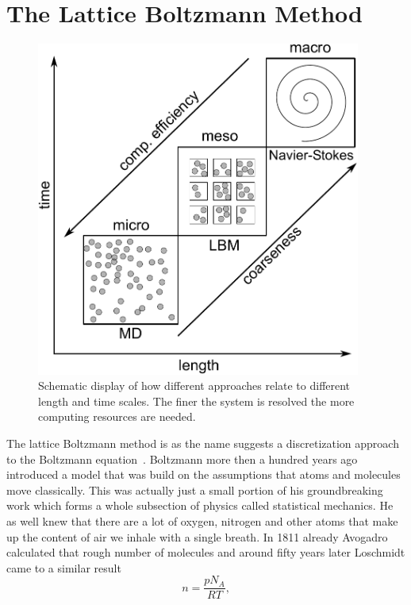 \section{The Lattice Boltzmann Method}\label{sec:LBM}
\begin{figure}
    \centering
    \includegraphics[width=0.95\textwidth]{graphics/Scales_problem.pdf}
    \caption{Schematic display of how different approaches relate to different length and time scales.
    The finer the system is resolved the more computing resources are needed.}
    \label{fig:scales_dummy}
\end{figure}
The lattice Boltzmann method is as the name suggests a discretization approach to the Boltzmann equation~\cite{krugerLatticeBoltzmannMethod2017, succi, wolf-gladrow}.
Boltzmann more then a hundred years ago introduced a model that was build on the assumptions that atoms and molecules move classically.
This was actually just a small portion of his groundbreaking work which forms a whole subsection of physics called statistical mechanics. 
He as well knew that there are a lot of oxygen, nitrogen and other atoms that make up the content of air we inhale with a single breath.
In 1811 already Avogadro calculated that rough number of molecules and around fifty years later Loschmidt came to a similar result~\cite{avogadro1811essai, loschmidt52grosse}
\begin{equation}
    n = \frac{p N_A}{R T},
\end{equation}
